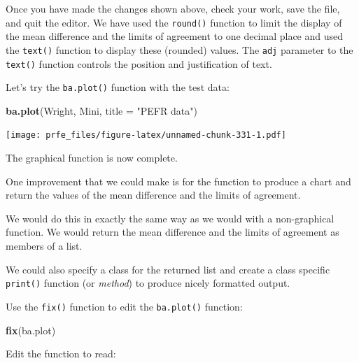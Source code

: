 \documentclass[12pt,a4paper]{book}
\newenvironment{Shaded}{\begin{snugshade}}{\end{snugshade}}
\newcommand{\DataTypeTok}[1]{\textcolor[rgb]{0.13,0.29,0.53}{#1}}
\newcommand{\KeywordTok}[1]{\textcolor[rgb]{0.13,0.29,0.53}{\textbf{#1}}}
\newcommand{\NormalTok}[1]{#1}
\newcommand{\StringTok}[1]{\textcolor[rgb]{0.31,0.60,0.02}{#1}}
\theoremstyle{definition}
\theoremstyle{definition}
\theoremstyle{definition}
\theoremstyle{remark}
\begin{document}
Once you have made the changes shown above, check your work, save the
file, and quit the editor. We have used the \texttt{round()} function to
limit the display of the mean difference and the limits of agreement to
one decimal place and used the \texttt{text()} function to display these
(rounded) values. The \texttt{adj} parameter to the \texttt{text()}
function controls the position and justification of text.

Let's try the \texttt{ba.plot()} function with the test data:

\begin{Shaded}
\begin{Highlighting}[]
\KeywordTok{ba.plot}\NormalTok{(Wright, Mini, }\DataTypeTok{title =} \StringTok{"PEFR data"}\NormalTok{)}
\end{Highlighting}
\end{Shaded}

\texttt{[image: prfe\_files/figure-latex/unnamed-chunk-331-1.pdf]}

The graphical function is now complete.

One improvement that we could make is for the function to produce a
chart and return the values of the mean difference and the limits of
agreement.

We would do this in exactly the same way as we would with a
non-graphical function. We would return the mean difference and the
limits of agreement as members of a list.

We could also specify a class for the returned list and create a class
specific \texttt{print()} function (or \emph{method}) to produce nicely
formatted output.

Use the \texttt{fix()} function to edit the \texttt{ba.plot()} function:

\begin{Shaded}
\begin{Highlighting}[]
\KeywordTok{fix}\NormalTok{(ba.plot)}
\end{Highlighting}
\end{Shaded}

Edit the function to read:
\end{document}
